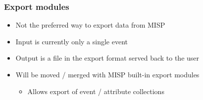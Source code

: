 \begin{frame}[fragile]
    \frametitle{Export modules}
    \begin{itemize}
        \item Not the preferred way to export data from MISP
        \item Input is currently only a single event
        \item Output is a file in the export format served back to the user
        \item Will be moved / merged with MISP built-in export modules
        \begin{itemize}
            \item Allows export of event / attribute collections
        \end{itemize}
    \end{itemize}
\end{frame}

